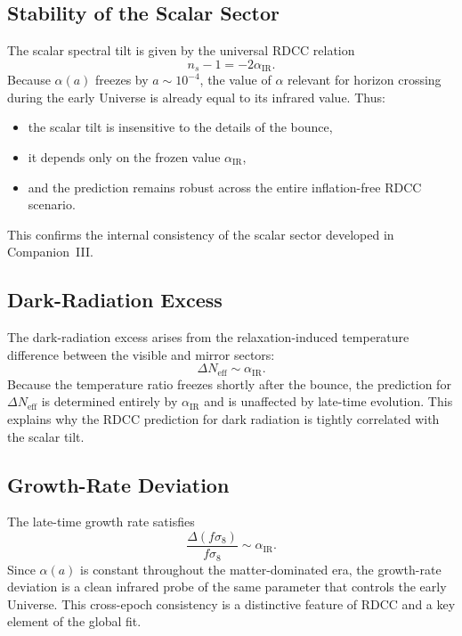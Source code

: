\documentclass[11pt,a4paper]{article}
\begin{document}
\subsection{Stability of the Scalar Sector}

The scalar spectral tilt is given by the universal RDCC relation
\begin{equation}
    n_s - 1 = -2\alpha_{\mathrm{IR}}.
\end{equation}
Because $\alpha(a)$ freezes by $a \sim 10^{-4}$, the value of $\alpha$ relevant for horizon crossing
during the early Universe is already equal to its infrared value. Thus:
\begin{itemize}
    \item the scalar tilt is insensitive to the details of the bounce,
    \item it depends only on the frozen value $\alpha_{\mathrm{IR}}$,
    \item and the prediction remains robust across the entire inflation-free RDCC scenario.
\end{itemize}
This confirms the internal consistency of the scalar sector developed in Companion~III.

\subsection{Dark-Radiation Excess}

The dark-radiation excess arises from the relaxation-induced temperature difference between the
visible and mirror sectors:
\begin{equation}
    \Delta N_{\mathrm{eff}} \sim \alpha_{\mathrm{IR}}.
\end{equation}
Because the temperature ratio freezes shortly after the bounce, the prediction for
$\Delta N_{\mathrm{eff}}$ is determined entirely by $\alpha_{\mathrm{IR}}$ and is unaffected by late-time
evolution. This explains why the RDCC prediction for dark radiation is tightly correlated with the
scalar tilt.

\subsection{Growth-Rate Deviation}

The late-time growth rate satisfies
\begin{equation}
    \frac{\Delta(f\sigma_8)}{f\sigma_8} \sim \alpha_{\mathrm{IR}}.
\end{equation}
Since $\alpha(a)$ is constant throughout the matter-dominated era, the growth-rate deviation is a
clean infrared probe of the same parameter that controls the early Universe. This cross-epoch
consistency is a distinctive feature of RDCC and a key element of the global fit.
\end{document}
